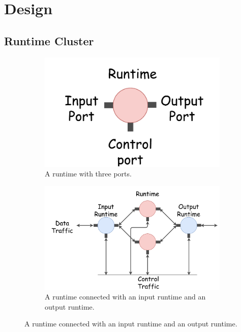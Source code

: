 \section{Design}

\subsection{Runtime Cluster}

\begin{figure}[!t]
\begin{subfigure}[t]{0.30\linewidth}
   \centering
   \includegraphics[width=\columnwidth]{figure/nfactor-runtime-with-port.pdf}
   \caption{A runtime with three ports.}\label{fig:rep-scale}
  \end{subfigure}\hfill
  \begin{subfigure}[t]{0.69\linewidth}
 \centering
   \includegraphics[width=\columnwidth]{figure/nfactor-runtime-connection.pdf}
   \caption{A runtime connected with an input runtime and an output runtime.}\label{fig:rep-recovery} \end{subfigure}\hfill

\end{figure}
